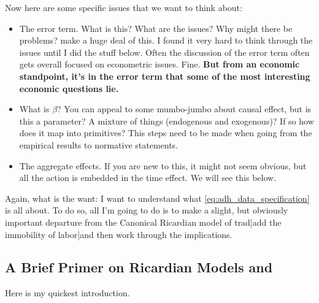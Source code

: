 \documentclass[pdftex,12pt]{article}
\begin{document}
Now here are some specific issues that we want to think about:
\begin{itemize}
\item The error term. What is this? What are the issues? Why might there be problems? \citet{david2013china} make a huge deal of this. I found it very hard to think through the issues until I did the stuff below. Often the discussion of the error term often gets overall focused on econometric issues. Fine. \textbf{But from an economic standpoint, it's in the error term that some of the most interesting economic questions lie.}

\item What is $\beta$? You can appeal to some mumbo-jumbo about causal effect, but is this a parameter? A mixture of things (endogenous and exogenous)? If so how does it map into primitives? This steps need to be made when going from the empirical results to normative statements.

\item The aggregate effects. If you are new to this, it might not seem obvious, but all the action is embedded in the time effect. We will see this below.
\end{itemize}
Again, what is the want: I want to understand what \ref{eq:adh_data_specification} is all about. To do so, all I'm going to do is to make a slight, but obviously important departure from the Canonical Ricardian model of trad|add the immobility of labor|and then work through the implications.

\subsection{A Brief Primer on Ricardian Models and \citet{eaton2002technology}}

Here is my quickest introduction.
\end{document}
